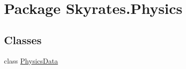 \hypertarget{namespace_skyrates_1_1_physics}{\section{Package Skyrates.\-Physics}
\label{namespace_skyrates_1_1_physics}
}
\subsection*{Classes}
\begin{DoxyCompactItemize}
\item 
class \hyperlink{class_skyrates_1_1_physics_1_1_physics_data}{Physics\-Data}
\end{DoxyCompactItemize}
